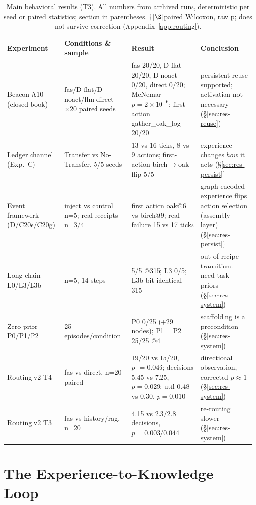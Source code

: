 \documentclass[10pt,a4paper]{article}
\begin{document}
\begin{table}[t]
\centering\small
\caption{Main behavioral results (T3). All numbers from archived runs, deterministic per seed or paired statistics; section in parentheses. $\dagger$[$\S $]paired Wilcoxon, raw p; does not survive correction (Appendix~\ref{app:routing}).}
\label{tab:behavior}
\begin{tabular}{L{3.6cm}L{5.2cm}L{3.6cm}L{2.4cm}}
\toprule
\textbf{Experiment} & \textbf{Conditions \& sample} & \textbf{Result} & \textbf{Conclusion} \\
\midrule
Beacon A10 (closed-book) & fas/D-flat/D-noact/llm-direct $\times 20$ paired seeds & fas 20/20, D-flat 20/20, D-noact 0/20, direct 0/20; McNemar $p{=}2\times10^{-6}$; first action gather\_oak\_log 20/20 & persistent reuse supported; activation not necessary (\S\ref{sec:res-reuse}) \\
Ledger channel (Exp.\ C) & Transfer vs No-Transfer, 5/5 seeds & 13 vs 16 ticks, 8 vs 9 actions; first-action birch$\rightarrow$oak flip 5/5 & experience changes \emph{how} it acts (\S\ref{sec:res-persist}) \\
Event framework (D/C20e/C20g) & inject vs control n=5; real receipts n=3/4 & first action oak@6 vs birch@9; real failure 15 vs 17 ticks & graph-encoded experience flips action selection (assembly layer) (\S\ref{sec:res-persist}) \\
Long chain L0/L3/L3b & n=5, 14 steps & 5/5 @315; L3 0/5; L3b bit-identical 315 & out-of-recipe transitions need task priors (\S\ref{sec:res-system}) \\
Zero prior P0/P1/P2 & 25 episodes/condition & P0 0/25 ($+29$ nodes); P1$=$P2 25/25 @4 & scaffolding is a precondition (\S\ref{sec:res-system}) \\
Routing v2 T4 & fas vs direct, n=20 paired & 19/20 vs 15/20, $p^{\dagger}{=}0.046$; decisions 5.45 vs 7.25, $p{=}0.029$; util 0.48 vs 0.30, $p{=}0.010$ & directional observation, corrected $p{\approx}1$ (\S\ref{sec:res-system}) \\
Routing v2 T3 & fas vs history/rag, n=20 & 4.15 vs 2.3/2.8 decisions, $p{=}0.003/0.044$ & re-routing slower (\S\ref{sec:res-system}) \\
\bottomrule
\end{tabular}
\end{table}

\section{The Experience-to-Knowledge Loop}
\label{sec:loop}
\end{document}
